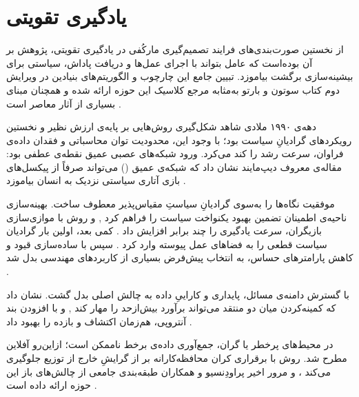 \section{یادگیری تقویتی}


از نخستین صورت‌بندی‌های فرایند تصمیم‌گیری مارکُفی در یادگیری تقویتی، پژوهش بر آن بوده‌است که عامل بتواند با اجرای عمل‌ها و دریافت پاداش، سیاستی برای بیشینه‌سازی برگشت بیاموزد. تبیین جامع این چارچوب و الگوریتم‌های بنیادین در ویرایش دوم کتاب سوتون و بارتو به‌مثابه مرجع کلاسیک این حوزه ارائه شده و همچنان مبنای بسیاری از آثار معاصر است \cite{SuttonBarto2018}. %


دهه‌‌ی ۱۹۹۰ ملادی شاهد شکل‌گیری روش‌هایی بر پایه‌ی ارزش
 نظیر  و نخستین رویکردهای گرادیانِ سیاست بود؛ با وجود این، محدودیت توان محاسباتی و فقدان داده‌ی فراوان، سرعت رشد را کند می‌کرد. ورود شبکه‌های عصبی عمیق نقطه‌ی عطفی بود: مقاله‌ی معروف دیپ‌مایند
  نشان داد که شبکه‌ی  عمیق () می‌تواند صرفاً از پیکسل‌های بازی آتاری سیاستی نزدیک به انسان بیاموزد \cite{Mnih2015}. %


موفقیت  نگاه‌ها را به‌سوی گرادیانِ سیاستِ مقیاس‌پذیر معطوف ساخت. بهینه‌سازی ناحیه‌ی اطمینان
  تضمین بهبود یکنواخت سیاست را فراهم کرد \cite{Schulman2015TRPO}, و روش  با موازی‌سازی بازیگران، سرعت یادگیری را چند برابر افزایش داد \cite{Mnih2016A3C}. %
کمی بعد،  اولین بار گرادیان سیاست قطعی را به فضاهای عمل پیوسته وارد کرد \cite{lillicrap2019continuouscontroldeepreinforcement}. %
سپس  با ساده‌سازی قیود  و کاهش پارامترهای حساس، به انتخاب پیش‌فرض بسیاری از کاربردهای مهندسی بدل شد \cite{Schulman2017PPO}. %


با گسترش دامنه‌ی مسائل، پایداری و کاراییِ داده به چالش اصلی بدل گشت.  نشان داد که کمینه‌کردن میان دو منتقد می‌تواند برآورد بیش‌از‌حد  را مهار کند \cite{Fujimoto2018TD3}, و  با افزودن بند آنتروپی، هم‌زمان اکتشاف و بازده را بهبود داد \cite{Haarnoja2018SAC}. %




در محیط‌های پرخطر یا گران، جمع‌آوری داده‌ی برخط ناممکن است؛ ازاین‌رو  آفلاین مطرح شد. روش  با برقراری کران محافظه‌کارانه بر  از گرایشِ خارج از توزیع جلوگیری می‌کند \cite{Kumar2020CQL}، و مرور اخیر پراودِنسیو و همکاران طبقه‌بندی جامعی از چالش‌های باز این حوزه ارائه داده است \cite{Prudencio2022OfflineSurvey}. %


